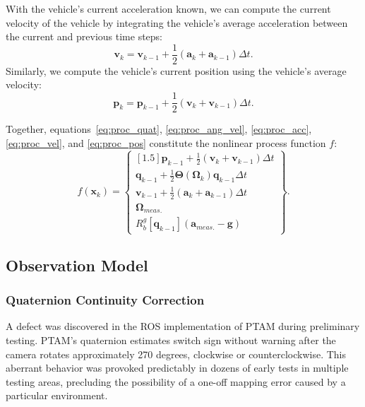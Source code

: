 With the vehicle's current acceleration known, we can compute the current velocity of the vehicle by integrating the vehicle's average acceleration between the current and previous time steps:
%
\begin{equation} \label{eq:proc_vel}
\mathbf{v}_{k} = \mathbf{v}_{k-1} + \frac{1}{2} \left( \mathbf{a}_{k} + \mathbf{a}_{k-1} \right) \Delta t .
\end{equation}
%
Similarly, we compute the vehicle's current position using the vehicle's average velocity:
%
\begin{equation} \label{eq:proc_pos}
\mathbf{p}_{k} = \mathbf{p}_{k-1} + \frac{1}{2} \left( \mathbf{v}_{k} + \mathbf{v}_{k-1} \right) \Delta t .
\end{equation}

Together, equations~\ref{eq:proc_quat}, \ref{eq:proc_ang_vel}, \ref{eq:proc_acc}, \ref{eq:proc_vel}, and \ref{eq:proc_pos} constitute the nonlinear process function $f$:
%
\begin{equation}
f \left( \mathbf{x}_{k} \right) = 
\begin{Bmatrix}[1.5]
   \mathbf{p}_{k-1} + \frac{1}{2} \left( \mathbf{v}_{k} + \mathbf{v}_{k-1} \right) \Delta t \\
   \mathbf{q}_{k-1} + \frac{1}{2} \mathbf{\Theta} \left( \bm{\Omega}_{k} \right) \mathbf{q}_{k-1} \Delta t \\
   \mathbf{v}_{k-1} + \frac{1}{2} \left( \mathbf{a}_{k} + \mathbf{a}_{k-1} \right) \Delta t \\
   \bm{\Omega}_{meas.} \\
   R^{g}_{b} \left[ \mathbf{q}_{k-1} \right] \left( \mathbf{a}_{meas.} - \mathbf{g} \right)
\end{Bmatrix} .
\end{equation}

\subsection{Observation Model} \label{Observation_Model}
\subsubsection{Quaternion Continuity Correction}

A defect was discovered in the ROS implementation of PTAM during preliminary testing. PTAM's quaternion estimates switch sign without warning after the camera rotates approximately 270 degrees, clockwise or counterclockwise. This aberrant behavior was provoked predictably in dozens of early tests in multiple testing areas, precluding the possibility of a one-off mapping error caused by a particular environment.


